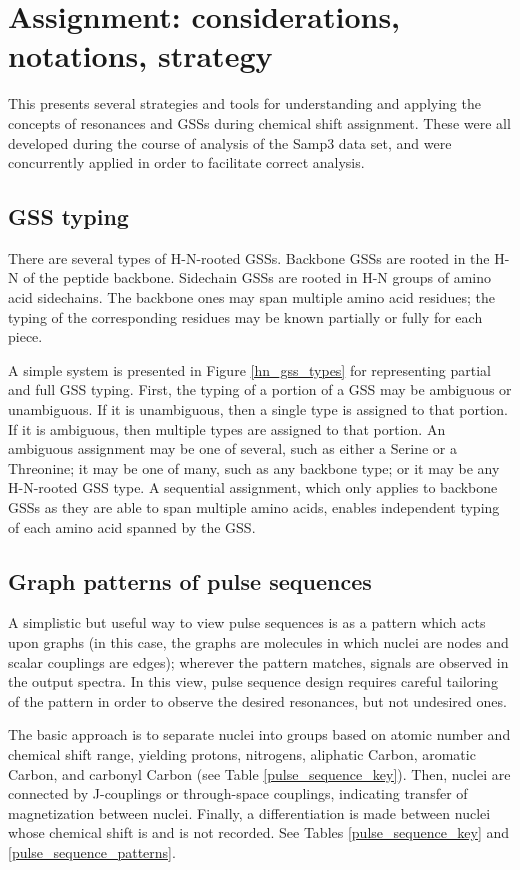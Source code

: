 \chapter{Assignment: considerations, notations, strategy}
This presents several strategies and tools for understanding and applying
the concepts of resonances and GSSs during chemical shift assignment.
These were all developed during the course of analysis of the Samp3 data set,
and were concurrently applied in order to facilitate correct analysis.


\section{GSS typing}
There are several types of H-N-rooted GSSs.  Backbone GSSs are rooted in the
H-N of the peptide backbone.  Sidechain GSSs are rooted in H-N groups of
amino acid sidechains.
The backbone ones may span multiple amino acid residues; the typing of the 
corresponding residues may be known partially or fully for each piece.

A simple system is presented in Figure \ref{hn_gss_types} for representing 
partial and full GSS typing.  First, the typing of a portion of a GSS may be 
ambiguous or unambiguous.  If it is unambiguous, then a single type is assigned
to that portion.  If it is ambiguous, then multiple types are assigned to that
portion.  An ambiguous assignment may be one of several, such as either a
Serine or a Threonine; it may be one of many, such as any backbone type; or
it may be any H-N-rooted GSS type.  A sequential assignment, which only applies
to backbone GSSs as they are able to span multiple amino acids, enables 
independent typing of each amino acid spanned by the GSS.


\section{Graph patterns of pulse sequences}
A simplistic but useful way to view pulse sequences is as a pattern which
acts upon graphs (in this case, the graphs are molecules in which nuclei are
nodes and scalar couplings are edges); wherever the pattern matches, signals 
are observed in the output spectra.  In this view, pulse sequence design 
requires careful tailoring of the pattern in order to observe the desired 
resonances, but not undesired ones.

The basic approach is to separate nuclei into groups based on atomic number
and chemical shift range, yielding protons, nitrogens, aliphatic Carbon,
aromatic Carbon, and carbonyl Carbon (see Table \ref{pulse_sequence_key}).
Then, nuclei are connected by J-couplings or through-space couplings, 
indicating transfer of magnetization between nuclei.
Finally, a differentiation is made between nuclei whose chemical shift is 
and is not recorded.  See Tables \ref{pulse_sequence_key} and 
\ref{pulse_sequence_patterns}.

